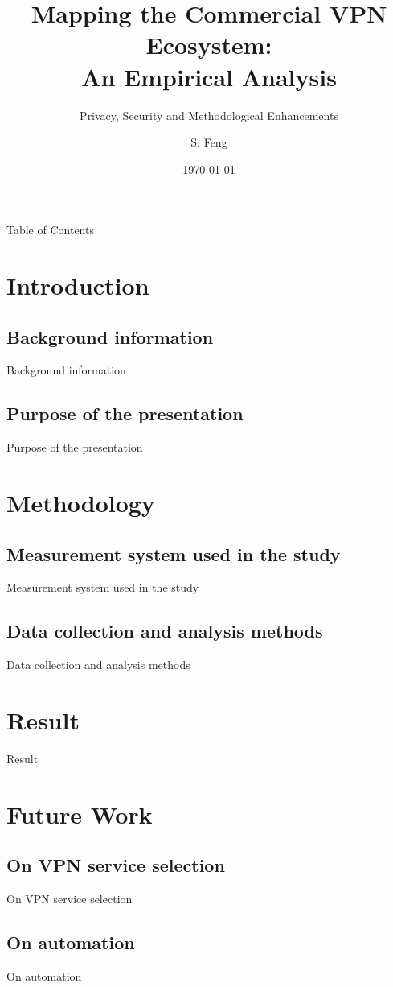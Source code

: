 \documentclass{beamer}
\title{Mapping the Commercial VPN Ecosystem:\\ An Empirical Analysis}
\subtitle[]{Privacy, Security and Methodological Enhancements}
\author[Feng, Shuo]{S. Feng}
\institute{NIMS Lab}
\date{\today}
\begin{document}
\frame{\titlepage}

\begin{frame}{Table of Contents}
  \tableofcontents
\end{frame}

\section{Introduction}
\subsection{Background information}
\begin{frame}{Background information}
\end{frame}

\subsection{Purpose of the presentation}
\begin{frame}{Purpose of the presentation}
\end{frame}

\section{Methodology}
\subsection{Measurement system used in the study}
\begin{frame}{Measurement system used in the study}
\end{frame}

\subsection{Data collection and analysis methods}
\begin{frame}{Data collection and analysis methods}
\end{frame}

\section{Result}
\begin{frame}{Result}
\end{frame}

\section{Future Work}
\subsection{On VPN service selection}
\begin{frame}{On VPN service selection}
\end{frame}

\subsection{On automation}
\begin{frame}{On automation}
\end{frame}
\end{document}
